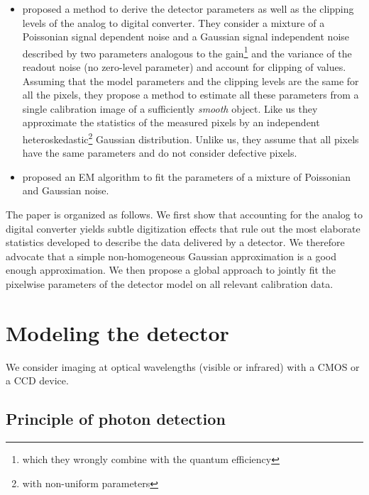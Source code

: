 \documentclass{aa}
\begin{document}
\begin{itemize}
\item \citet{Foi_et_al-2008-Poissonian_Gaussian_noise_model_fitting} proposed a
method to derive the detector parameters as well as the clipping levels of the
analog to digital converter.  They consider a mixture of a Poissonian signal
dependent noise and a Gaussian signal independent noise described by two
parameters analogous to the gain\footnote{which they wrongly combine with the
quantum efficiency} and the variance of the readout noise (no zero-level
parameter) and account for clipping of values. Assuming that the model
parameters and the clipping levels are the same for all the pixels, they propose
a method to estimate all these parameters from a single calibration image of a
sufficiently \emph{smooth} object.  Like us they approximate the statistics of
the measured pixels by an independent heteroskedastic\footnote{with non-uniform
parameters} Gaussian distribution. Unlike us, they assume that all pixels have
the same parameters and do not consider defective pixels.

\item \citet{Jezierska_et_al-2011-Poisson_Gaussian_noise} proposed an EM
  algorithm to fit the parameters of a mixture of Poissonian and Gaussian
  noise.

\end{itemize}

The paper is organized as follows. We first show that accounting for the analog
to digital converter yields subtle digitization effects that rule out the most
elaborate statistics developed to describe the data delivered by a detector.
We therefore advocate that a simple non-homogeneous Gaussian approximation is a
good enough approximation. We then propose a global approach to jointly fit the
pixelwise parameters of the detector model on all relevant calibration data.




\section{Modeling the detector}
\label{sec:detector-model}

We consider imaging at optical wavelengths (visible or infrared) with a CMOS or
a CCD device.


\subsection{Principle of photon detection}
\label{sec:detection-principle}
\end{document}
